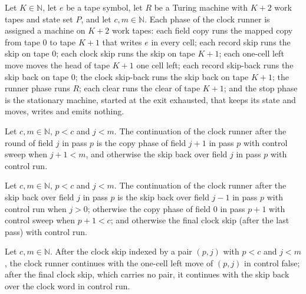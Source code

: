 \begin{definition}
\label{Turing.cw_rows}
\leanok
{}
Let $K\in\mathbb{N}$, let $e$ be a tape symbol, let $R$ be a Turing machine with $K+2$ work
tapes and state set $P$, and let $c,m\in\mathbb{N}$. Each phase of the clock runner is assigned
a machine on $K+2$ work tapes: each field copy runs the mapped copy from tape $0$ to tape $K+1$
that writes $e$ in every cell; each record skip runs the skip on tape $0$; each clock skip runs
the skip on tape $K+1$; each one-cell left move moves the head of tape $K+1$ one cell left;
each record skip-back runs the skip back on tape $0$; the clock skip-back runs the skip back on
tape $K+1$; the runner phase runs $R$; each clear runs the clear of tape $K+1$; and the stop
phase is the stationary machine, started at the exit exhausted, that keeps its state and moves,
writes and emits nothing.
\end{definition}

\begin{definition}
\label{Turing.cw_next}
\leanok
{}
Let $c,m\in\mathbb{N}$, $p<c$ and $j<m$. The continuation of the clock runner after the round
of field $j$ in pass $p$ is the copy phase of field $j+1$ in pass $p$ with control sweep when
$j+1<m$, and otherwise the skip back over field $j$ in pass $p$ with control run.
\end{definition}

\begin{definition}
\label{Turing.cw_prev}
\leanok
{}
Let $c,m\in\mathbb{N}$, $p<c$ and $j<m$. The continuation of the clock runner after the skip
back over field $j$ in pass $p$ is the skip back over field $j-1$ in pass $p$ with control run
when $j>0$; otherwise the copy phase of field $0$ in pass $p+1$ with control sweep when
$p+1<c$; and otherwise the final clock skip (after the last pass) with control run.
\end{definition}

\begin{definition}
\label{Turing.cw_afterSkip}
\leanok
{}
Let $c,m\in\mathbb{N}$. After the clock skip indexed by a pair $(p,j)$ with $p<c$ and $j<m$,
the clock runner continues with the one-cell left move of $(p,j)$ in control false; after the
final clock skip, which carries no pair, it continues with the skip back over the clock word in
control run.
\end{definition}

